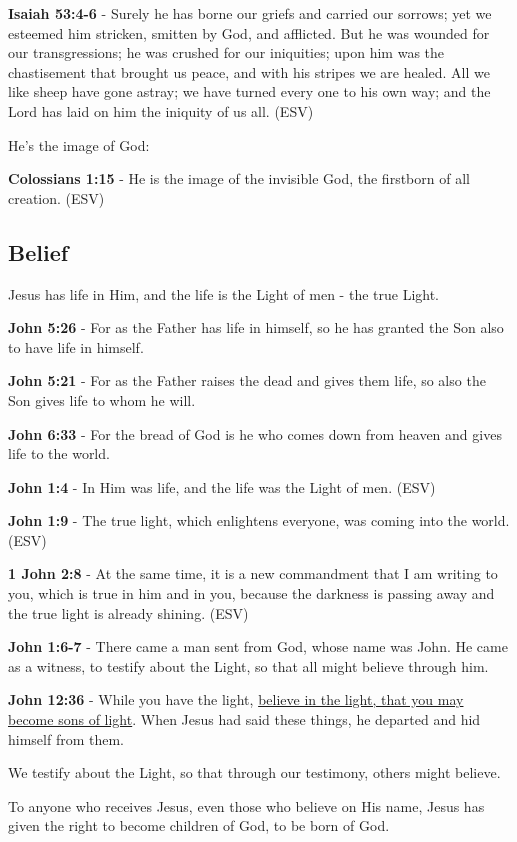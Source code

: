 \documentclass[11pt]{article}
\begin{document}
\textbf{Isaiah 53:4-6} - Surely he has borne our griefs and carried our sorrows; yet we esteemed him stricken, smitten by God, and afflicted. But he was wounded for our transgressions; he was crushed for our iniquities; upon him was the chastisement that brought us peace, and with his stripes we are healed. All we like sheep have gone astray; we have turned every one to his own way; and the Lord has laid on him the iniquity of us all. (ESV)

He's the image of God:

\textbf{Colossians 1:15} - He is the image of the invisible God, the firstborn of all creation. (ESV)

\subsection{Belief}
\label{sec:org13b0c1d}
Jesus has life in Him, and the life is the Light of men - the true Light.

\textbf{John 5:26} - For as the Father has life in himself, so he has granted the Son also to have life in himself.

\textbf{John 5:21} - For as the Father raises the dead and gives them life, so also the Son gives life to whom he will.

\textbf{John 6:33} - For the bread of God is he who comes down from heaven and gives life to the world.

\textbf{John 1:4} - In Him was life, and the life was the Light of men. (ESV)

\textbf{John 1:9} - The true light, which enlightens everyone, was coming into the world. (ESV)

\textbf{1 John 2:8} -  At the same time, it is a new commandment that I am writing to you, which is true in him and in you, because the darkness is passing away and the true light is already shining.  (ESV)

\textbf{John 1:6-7} - There came a man sent from God, whose name was John. He came as a witness, to testify about the Light, so that all might believe through him.

\textbf{John 12:36} - While you have the light, \uline{believe in the light, that you may become sons of light}. When Jesus had said these things, he departed and hid himself from them.

We testify about the Light, so that through our testimony, others might believe.

To anyone who receives Jesus, even those who believe on His name, Jesus has given the right to become children of God, to be born of God.
\end{document}
